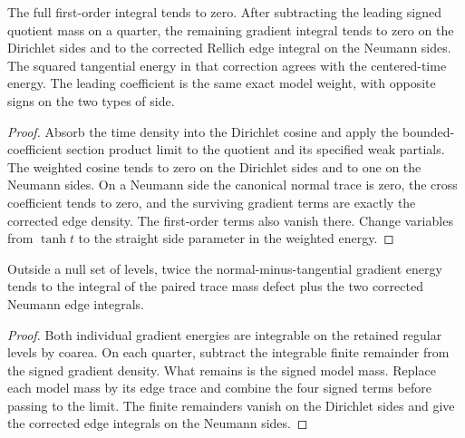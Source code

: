 \begin{lemma}
\label{lem:mixed-level-remainders}
\leanok
The full first-order integral tends to zero. After subtracting the
leading signed quotient mass on a quarter, the remaining gradient
integral tends to zero on the Dirichlet sides and to the corrected
Rellich edge integral on the Neumann sides. The squared tangential
energy in that correction agrees with the centered-time energy.
The leading coefficient is the same exact model weight, with opposite
signs on the two types of side.
\end{lemma}
\begin{proof}
\leanok
Absorb the time density into the Dirichlet cosine and apply the
bounded-coefficient section product limit to the quotient and its
specified weak partials. The weighted cosine tends to zero on the
Dirichlet sides and to one on the Neumann sides. On a Neumann side the
canonical normal trace is zero, the cross coefficient tends to zero,
and the surviving gradient terms are exactly the corrected edge
density. The first-order terms also vanish there. Change variables
from $\tanh t$ to the straight side parameter in the weighted energy.
\end{proof}

\begin{lemma}
\label{lem:mixed-level-signed-gradient}
\leanok
Outside a null set of levels, twice the normal-minus-tangential
gradient energy tends to the integral of the paired trace mass defect
plus the two corrected Neumann edge integrals.
\end{lemma}

\begin{proof}
\leanok
Both individual gradient energies are integrable on the retained
regular levels by coarea. On each quarter, subtract the integrable
finite remainder from the signed gradient density. What remains is
the signed model mass. Replace each model mass by its edge trace and
combine the four signed terms before passing to the limit. The finite
remainders vanish on the Dirichlet sides and give the corrected edge
integrals on the Neumann sides.
\end{proof}

